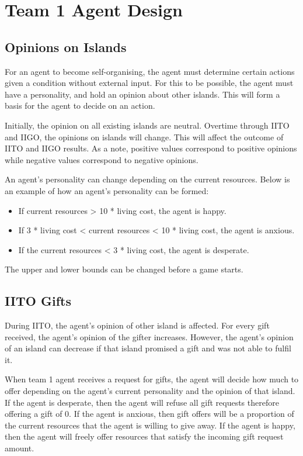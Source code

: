 \chapter{Team 1 Agent Design}

\section{Opinions on Islands}
For an agent to become self-organising, the agent must determine certain actions given a condition without external input. For this to be possible, the agent must have a personality, and hold an opinion about other islands. This will form a basis for the agent to decide on an action.

Initially, the opinion on all existing islands are neutral. Overtime through IITO and IIGO, the opinions on islands will change. This will affect the outcome of IITO and IIGO results. As a note, positive values correspond to positive opinions while negative values correspond to negative opinions.

An agent's personality can change depending on the current resources. Below is an example of how an agent's personality can be formed:
\begin{itemize}
    \item If current resources > 10 * living cost, the agent is happy.
    \item If 3 * living cost < current resources < 10 * living cost, the agent is anxious.
    \item If the current resources < 3 * living cost, the agent is desperate.
\end{itemize}
The upper and lower bounds can be changed before a game starts. 

\section{IITO Gifts}
During IITO, the agent's opinion of other island is affected. For every gift received, the agent's opinion of the gifter increases. However, the agent's opinion of an island can decrease if that island promised a gift and was not able to fulfil it. 

When team 1 agent receives a request for gifts, the agent will decide how much to offer depending on the agent's current personality and the opinion of that island. If the agent is desperate, then the agent will refuse all gift requests therefore offering a gift of 0. If the agent is anxious, then gift offers will be a proportion of the current resources that the agent is willing to give away. If the agent is happy, then the agent will freely offer resources that satisfy the incoming gift request amount.

